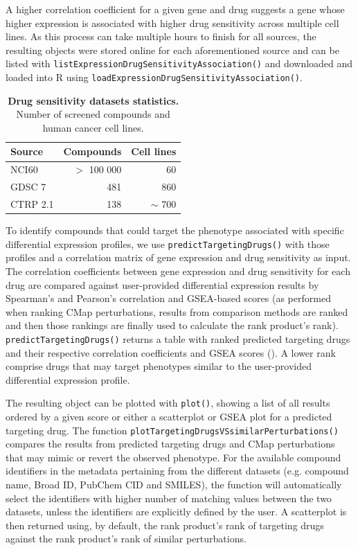 A higher correlation coefficient for a given gene and drug suggests a gene whose higher expression is associated with higher drug sensitivity across multiple cell lines. As this process can take multiple hours to finish for all sources, the resulting objects were stored online for each aforementioned source and can be listed with \texttt{listExpressionDrugSensitivityAssociation()} and downloaded and loaded into R using \texttt{loadExpressionDrugSensitivityAssociation()}.

\begin{table}
\centering
\parnotereset
\small
\caption[Drug sensitivity datasets statistics]{\textbf{Drug sensitivity datasets statistics.} Number of screened compounds and human cancer cell lines.}
\label{tab:drug-sensitivity-datasets}
\begin{tabularx}{.47\textwidth}{ l r r }
\toprule
\textbf{Source}   & \textbf{Compounds} & \textbf{Cell lines} \\
\midrule
NCI60             &                   $>$ 100 000 & 60 \\
GDSC 7            &                           481 & 860 \\
CTRP 2.1          &                           138 & $\sim$ 700 \\
\bottomrule
\end{tabularx}
\parnotes
\end{table}

To identify compounds that could target the phenotype associated with specific differential expression profiles, we use \texttt{predictTargetingDrugs()} with those profiles and a correlation matrix of gene expression and drug sensitivity as input. The correlation coefficients between gene expression and drug sensitivity for each drug are compared against user-provided differential expression results by Spearman’s and Pearson’s correlation and GSEA-based scores (as performed when ranking CMap perturbations, results from comparison methods are ranked and then those rankings are finally used to calculate the rank product’s rank). \texttt{predictTargetingDrugs()} returns a table with ranked predicted targeting drugs and their respective correlation coefficients and GSEA scores (). A lower rank comprise drugs that may target phenotypes similar to the user-provided differential expression profile.

The resulting object can be plotted with \texttt{plot()}, showing a list of all results ordered by a given score or either a scatterplot or GSEA plot for a predicted targeting drug. The function \texttt{plotTargetingDrugsVSsimilarPerturbations()} compares the results from predicted targeting drugs and CMap perturbations that may mimic or revert the observed phenotype. For the available compound identifiers in the metadata pertaining from the different datasets (e.g. compound name, Broad ID, PubChem CID and SMILES), the function will automatically select the identifiers with higher number of matching values between the two datasets, unless the identifiers are explicitly defined by the user. A scatterplot is then returned using, by default, the rank product’s rank of targeting drugs against the rank product’s rank of similar perturbations.


